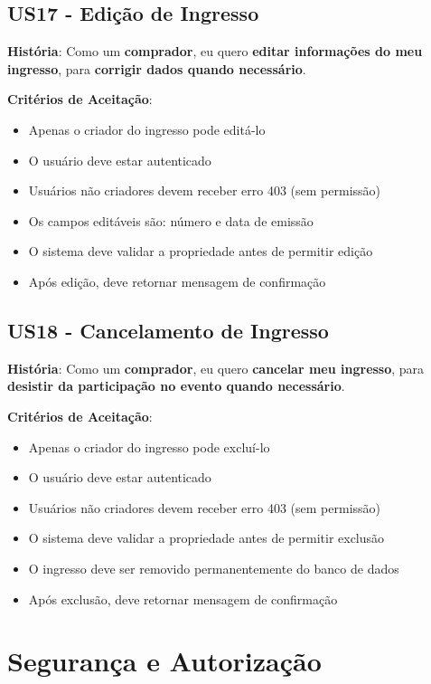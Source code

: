 \documentclass[12pt,a4paper]{article}
\begin{document}
\subsection{US17 - Edição de Ingresso}

\textbf{História}: Como um \textbf{comprador}, eu quero \textbf{editar informações do meu ingresso}, para \textbf{corrigir dados quando necessário}.

\textbf{Critérios de Aceitação}:
\begin{itemize}
    \item Apenas o criador do ingresso pode editá-lo
    \item O usuário deve estar autenticado
    \item Usuários não criadores devem receber erro 403 (sem permissão)
    \item Os campos editáveis são: número e data de emissão
    \item O sistema deve validar a propriedade antes de permitir edição
    \item Após edição, deve retornar mensagem de confirmação
\end{itemize}

\subsection{US18 - Cancelamento de Ingresso}

\textbf{História}: Como um \textbf{comprador}, eu quero \textbf{cancelar meu ingresso}, para \textbf{desistir da participação no evento quando necessário}.

\textbf{Critérios de Aceitação}:
\begin{itemize}
    \item Apenas o criador do ingresso pode excluí-lo
    \item O usuário deve estar autenticado
    \item Usuários não criadores devem receber erro 403 (sem permissão)
    \item O sistema deve validar a propriedade antes de permitir exclusão
    \item O ingresso deve ser removido permanentemente do banco de dados
    \item Após exclusão, deve retornar mensagem de confirmação
\end{itemize}

\section{Segurança e Autorização}
\end{document}
